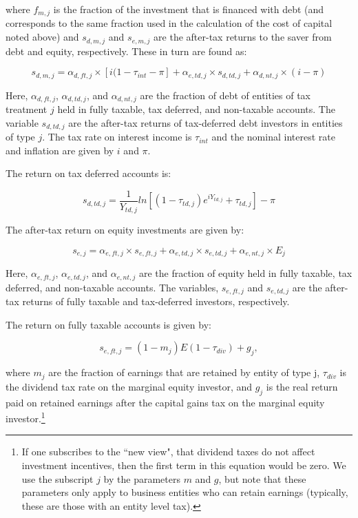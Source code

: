 \documentclass[article,11pt,letterpaper,fleqn]{article}
\theoremstyle{definition}
\numberwithin{equation}{section}
\begin{document}
\noindent\noindent where $f_{m,j}$ is the fraction of the investment that is financed with debt (and corresponds to the same fraction used in the calculation of the cost of capital noted above) and $s_{d,m,j}$ and $s_{e,m,j}$ are the after-tax returns to the saver from debt and equity, respectively.  These in turn are found as:

\begin{equation}
s_{d,m,j} = \alpha_{d,ft,j}\times \left[i(1-\tau_{int}-\pi\right] + \alpha_{e,td,j}\times s_{d,td,j} + \alpha_{d,nt,j}\times (i-\pi)
\end{equation}

Here, $\alpha_{d,ft,j}$, $\alpha_{d,td,j}$, and $\alpha_{d,nt,j}$ are the fraction of debt of entities of tax treatment $j$ held in fully taxable, tax deferred, and non-taxable accounts.  The variable $s_{d,td,j}$ are the after-tax returns of tax-deferred debt investors in entities of type $j$.  The tax rate on interest income is $\tau_{int}$ and the nominal interest rate and inflation are given by $i$ and $\pi$.


 The return on tax deferred accounts is:
 
 \begin{equation}
s_{d,td,j} = \frac{1}{Y_{td,j}}ln \left[(1-\tau_{td,j})e^{iY_{td,j}}+\tau_{td,j}\right]-\pi
\end{equation}


The after-tax return on equity investments are given by:

\begin{equation}
s_{e,j} = \alpha_{e,ft,j}\times s_{e,ft,j} + \alpha_{e,td,j}\times s_{e,td,j} + \alpha_{e,nt,j}\times E_{j}
\end{equation}

 

Here, $\alpha_{e,ft,j}$, $\alpha_{e,td,j}$, and $\alpha_{e,nt,j}$ are the fraction of equity held in fully taxable, tax deferred, and non-taxable accounts.  The variables, $s_{e,ft,j}$ and $s_{e,td,j}$ are the after-tax returns of fully taxable and tax-deferred investors, respectively.  

The return on fully taxable accounts is given by:

\begin{equation}
s_{e,ft,j} = (1-m_{j})E(1-\tau_{div}) + g_{j},
\end{equation}

\noindent\noindent where $m_{j}$ are the fraction of earnings that are retained by entity of type j, $\tau_{div}$ is the dividend tax rate on the marginal equity investor, and $g_{j}$ is the real return paid on retained earnings after the capital gains tax on the marginal equity investor.\footnote{If one subscribes to the ``new view", that dividend taxes do not affect investment incentives, then the first term in this equation would be zero.  We use the subscript $j$ by the parameters $m$ and $g$, but note that these parameters only apply to business entities who can retain earnings (typically, these are those with an entity level tax).}
 
\end{document}
